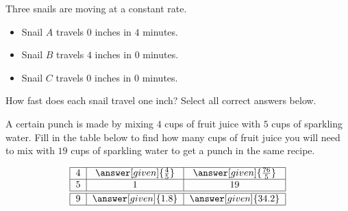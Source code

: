 \documentclass[nooutcomes]{ximera}
\begin{document}
\begin{problem}
Three snails are moving at a constant rate.

\begin{itemize}
	\item Snail $A$ travels $0$ inches in $4$ minutes.
	\item Snail $B$ travels $4$ inches in $0$ minutes.
	\item Snail $C$ travels $0$ inches in $0$ minutes.
\end{itemize}

How fast does each snail travel one inch?  Select all correct answers below.
\begin{selectAll}
\end{selectAll}
\end{problem}




\begin{problem}
A certain punch is made by mixing $4$ cups of fruit juice with $5$ cups of sparkling water.  Fill in the table below to find how many cups of fruit juice you will need to mix with $19$ cups of sparkling water to get a punch in the same recipe.

\[
\begin{tabular}{|c|c|c|} \hline
4 & $\answer[given]{\frac{4}{5}}$ & $\answer[given]{\frac{76}{5}}$ \\ \hline
5 & 1 & 19 \\ \hline \hline
9 & $\answer[given]{1.8}$ & $\answer[given]{34.2}$ \\ \hline
\end{tabular}
\]
\end{problem}
\end{document}
